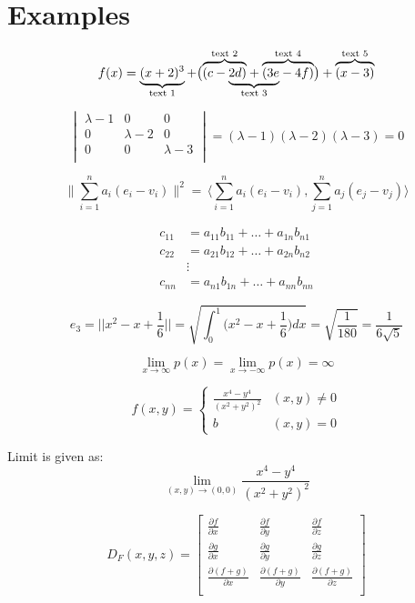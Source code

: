 \section{Examples}

\[
  f(x) = 
    \underbrace{(x + 2)^3}_\text{text 1} + 
    \bigl(
      \mathrlap{\overbrace{\phantom{(c - 2d)}}^{\text{text 2}}}
      (c - 
      \mathrlap{\underbrace{\phantom{2d) + (3e}}_{\text{text 3}}}
      2d) +
      \overbrace{(3e - 4f)}^{\text{text 4}}
    \bigr) + 
    \overbrace{(x - 3)}^\text{text 5}
\]

$$\begin{vmatrix}
	\lambda -1 		& 0 				& 0				\\
	0 				& \lambda -2		& 0				\\
	0 				& 0 				& \lambda-3		\\
	\end{vmatrix}
=(\lambda-1)(\lambda-2)(\lambda-3)=0$$

\begin{equation*}
	\Big\|\sum_{i=1}^na_i(e_i-v_i)\Big\|^2=\,\Big\langle \sum_{i=1}^n a_i(e_i-v_i),\sum_{j=1}^n a_j(e_j-v_j)\Big\rangle
\end{equation*} 

\begin{equation} 
    \begin{split} 
    c_{11}& = a_{11}b_{11}+\dots+a_{1n}b_{n1}\\
    c_{22}&= a_{21} b_{12} +\dots+a_{2n} b_{n2} \\
    &\vdots\\
    c_{nn} & = a_{n1} b_{1n} +\dots+a_{nn}b_{nn}
    \end{split} 
\end{equation} 

\[
	e_3=\Big|\Big|x^2-x+\dfrac{1}{6}\Big|\Big|=\sqrt{\displaystyle \int_{0}^{1}\Big(x^2-x+\dfrac{1}{6}\Big)dx}=\sqrt{\dfrac{1}{180}}=\dfrac{1}{6\sqrt{5}}
\]

$$\lim_{x \to \infty}p(x) = \lim_{x \to -\infty}p(x) = \infty$$

\[
	f(x,y) =
	\begin{cases} 
		\frac{x^4 - y^4}{(x^2 + y^2)^2} & (x,y) \neq 0 \\
		b 								& (x,y) = 0
	\end{cases}
\]

Limit is given as:
\[
\lim_{(x,y)\to(0,0)}\frac{x^4-y^4}{(x^2+y^2)^2}
\]

$$
	D_F (x,y,z)=
	\begin{bmatrix}
		\frac{\partial f}{\partial x} & \frac{\partial f}{\partial y} & \frac{\partial f}{\partial z}\\
		\frac{\partial g}{\partial x} & \frac{\partial g}{\partial y} & \frac{\partial g}{\partial z}\\
		\frac{\partial (f+g)}{\partial x} & \frac{\partial (f+g)}{\partial y} & \frac{\partial (f+g)}{\partial z}\\
	\end{bmatrix}
$$


